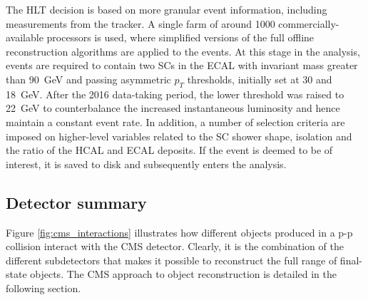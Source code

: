 The HLT decision is based on more granular event information, including measurements from the tracker. A single farm of around 1000 commercially-available processors is used, where simplified versions of the full offline reconstruction algorithms are applied to the events. At this stage in the \Hgg analysis, events are required to contain two SCs in the ECAL with invariant mass greater than 90~GeV and passing asymmetric $p_T$ thresholds, initially set at 30 and 18~GeV. After the 2016 data-taking period, the lower threshold was raised to 22~GeV to counterbalance the increased instantaneous luminosity and hence maintain a constant event rate. In addition, a number of selection criteria are imposed on higher-level variables related to the SC shower shape, isolation and the ratio of the HCAL and ECAL deposits. If the event is deemed to be of interest, it is saved to disk and subsequently enters the \Hgg analysis.

\subsection{Detector summary}
Figure \ref{fig:cms_interactions} illustrates how different objects produced in a p-p collision interact with the CMS detector. Clearly, it is the combination of the different subdetectors that makes it possible to reconstruct the full range of final-state objects. The CMS approach to object reconstruction is detailed in the following section.


